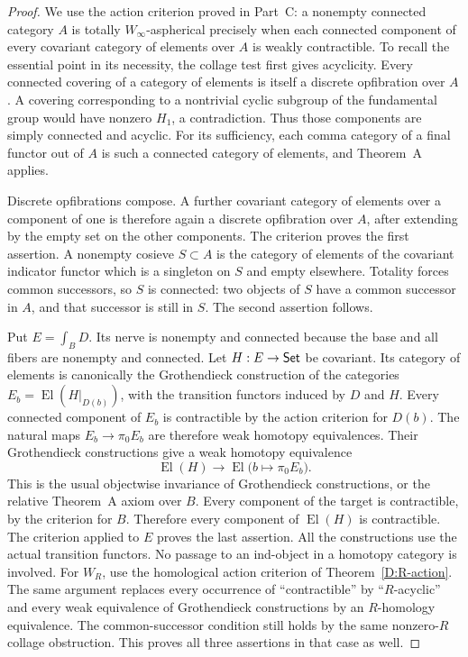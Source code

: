 \begin{proof}
We use the action criterion proved in Part~C: a nonempty connected
category $A$ is totally $W_\infty$-aspherical precisely when each
connected component of every covariant category of elements over
$A$ is weakly contractible. To recall the essential point in its
necessity, the collage test first gives acyclicity. Every connected
covering of a category of elements is itself a discrete opfibration
over $A$. A covering corresponding to a nontrivial cyclic subgroup
of the fundamental group would have nonzero $H_1$, a contradiction.
Thus those components are simply connected and acyclic. For its
sufficiency, each comma category of a final functor out of $A$ is
such a connected category of elements, and Theorem~A applies.

Discrete opfibrations compose. A further covariant category of
elements over a component of one is therefore again a discrete
opfibration over $A$, after extending by the empty set on the other
components. The criterion proves the first assertion. A nonempty
cosieve $S\subset A$ is the category of elements of the covariant
indicator functor which is a singleton on $S$ and empty elsewhere.
Totality forces common successors, so $S$ is connected: two objects
of $S$ have a common successor in $A$, and that successor is still
in $S$. The second assertion follows.

Put $E=\int_BD$. Its nerve is nonempty and connected because the
base and all fibers are nonempty and connected. Let $H:E\to\mathsf{Set}$
be covariant. Its category of elements is canonically the
Grothendieck construction of the categories
$E_b=\operatorname{El}(H|_{D(b)})$, with the transition functors
induced by $D$ and $H$. Every connected component of $E_b$ is
contractible by the action criterion for $D(b)$. The natural maps
$E_b\to\pi_0 E_b$ are therefore weak homotopy equivalences.
Their Grothendieck constructions give a weak homotopy equivalence
\[
 \operatorname{El}(H)\longrightarrow
 \operatorname{El}\bigl(b\mapsto\pi_0 E_b\bigr).
\]
This is the usual objectwise invariance of Grothendieck
constructions, or the relative Theorem~A axiom over $B$.
Every component of the target is contractible, by the criterion for
$B$. Therefore every component of $\operatorname{El}(H)$ is
contractible. The criterion applied to $E$ proves the last assertion.
All the constructions use the actual transition functors. No
passage to an ind-object in a homotopy category is involved.
For $W_R$, use the homological action criterion of
Theorem~\ref{D:R-action}. The same argument replaces every
occurrence of ``contractible'' by ``$R$-acyclic'' and every
weak equivalence of Grothendieck constructions by an
$R$-homology equivalence. The common-successor condition
still holds by the same nonzero-$R$ collage obstruction.
This proves all three assertions in that case as well.
\end{proof}


